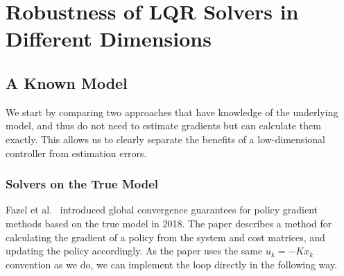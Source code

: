 \chapter{Robustness of LQR Solvers in Different Dimensions}
\label{chap:lqr}

\section{A Known Model}
\label{sec:known-model}

We start by comparing two approaches that have knowledge of the underlying model,
and thus do not need to estimate gradients but can calculate them exactly. This allows
us to clearly separate the benefits of a low-dimensional controller from estimation
errors.

\subsection{Solvers on the True Model}
\label{subsec:known-model-setting}

Fazel et al.~\cite{Fazel2018Global} introduced global convergence guarantees for policy gradient methods based on the
true model in 2018. The paper describes a method for calculating the gradient of a policy from
the system and cost matrices, and updating the policy accordingly. As the paper uses the same $u_k = -K x_k$
convention as we do, we can implement the loop directly in the following way.

